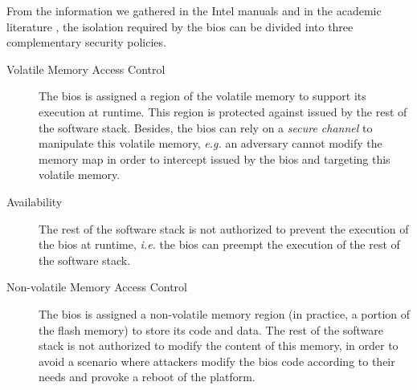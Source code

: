 %
From the information we gathered in the Intel manuals and in the academic literature , 
the isolation required by the \ac{bios} can be divided into three complementary security policies.

\begin{description}
\item [Volatile Memory Access Control]
  The \ac{bios} is assigned a region of the volatile memory  to support its execution at
  runtime. This region is protected against \IOs issued by the rest of the software
  stack.
  Besides, the \ac{bios} can rely on a \emph{secure channel}   to
  manipulate this volatile memory, \emph{e.g.} an adversary cannot modify the
  memory map in order to intercept \IOs issued by the \ac{bios} and targeting
  this volatile memory.
\item [Availability]
  The rest of the software stack is not authorized to prevent the execution of
  the \ac{bios} at runtime, \emph{i.e.} the \ac{bios} can preempt the execution
  of the rest of the software stack.
\item [Non-volatile Memory Access Control]
  The \ac{bios} is assigned a non-volatile memory region (in practice, a portion
  of the flash memory) to store its code and data.
  The rest of the software stack is not authorized to modify the content of this
  memory, in order to avoid a scenario where attackers modify the \ac{bios} code
  according to their needs and provoke a reboot of the platform.
\end{description}

